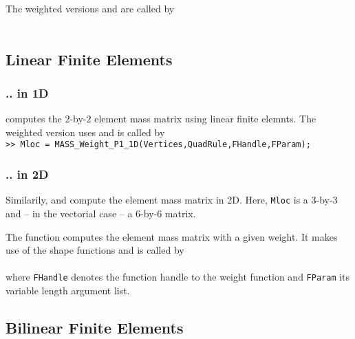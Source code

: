  The weighted versions  and  are called by \\

 \\


\subsection{Linear Finite Elements} 

\subsubsection{.. in 1D}

  computes the $2$-by-$2$ element mass matrix using linear finite elemnts. The weighted version  uses  and is called by \\

{\tt >> Mloc = MASS\_Weight\_P1\_1D(Vertices,QuadRule,FHandle,FParam);}

\subsubsection{.. in 2D}

 Similarily,  and  compute the element mass matrix in 2D. Here, {\tt Mloc} is a $3$-by-$3$ and -- in the vectorial case -- a $6$-by-$6$ matrix.
 
 


 The function  computes the element mass matrix with a given weight. It makes use of the shape functions  and is called by \\

 \\

 where {\tt FHandle} denotes the function handle to the weight function and {\tt FParam} its variable length argument list.


\subsection{Bilinear Finite Elements} 

